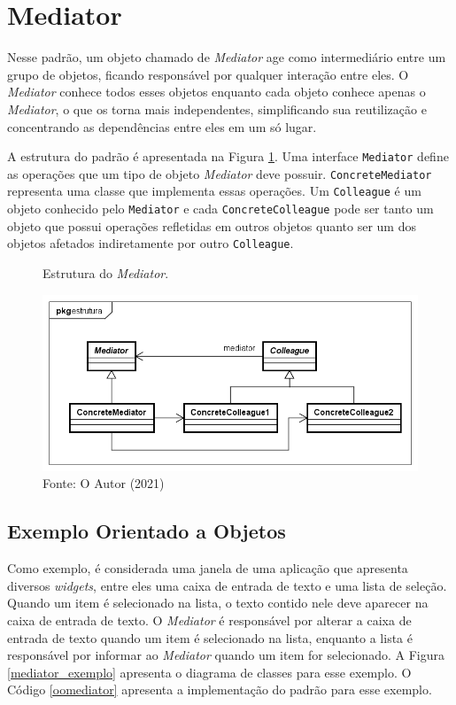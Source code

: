 \section{Mediator}


Nesse padrão, um objeto chamado de \textit{Mediator} age como intermediário 
entre um grupo de objetos, ficando responsável por qualquer 
interação entre eles. O \textit{Mediator} conhece todos 
esses objetos enquanto cada objeto conhece apenas o 
\textit{Mediator}, o que os torna 
mais independentes, simplificando sua reutilização
 e concentrando as dependências entre eles 
em um só lugar. \cite{gamma:1995}

A estrutura do padrão é apresentada na Figura \ref{mediator_struct}. 
Uma interface \texttt{Mediator} define as operações que um tipo de 
objeto \textit{Mediator} deve possuir. \texttt{ConcreteMediator} representa 
uma classe que implementa essas operações. Um \texttt{Colleague} 
é um objeto conhecido pelo \texttt{Mediator} e cada \texttt{ConcreteColleague} 
pode ser tanto um objeto que possui operações refletidas 
em outros objetos quanto ser um dos objetos afetados 
indiretamente por outro \texttt{Colleague}.

\begin{figure}[htb]
	\caption{\label{mediator_struct}Estrutura do \textit{Mediator}.}
	\begin{center}
	    \includegraphics[scale=0.5]{5_padroes-contexto-funcional/5.3_comportamentais/5.3.05_mediator/mediator_estrutura.png}
	\end{center}
  \caption*{Fonte: O Autor (2021)}
\end{figure}

\subsection*{Exemplo Orientado a Objetos}

Como exemplo, é considerada uma janela de uma aplicação 
que apresenta diversos \textit{widgets}, entre eles uma caixa 
de entrada de texto e uma lista de seleção. Quando um item é 
selecionado na lista, o texto contido nele deve aparecer 
na caixa de entrada de texto. O \textit{Mediator} é responsável 
por alterar a caixa de entrada de texto quando um item 
é selecionado na lista, enquanto a lista é responsável 
por informar ao \textit{Mediator} quando um item for selecionado. 
A Figura \ref{mediator_exemplo} apresenta o diagrama 
de classes para esse exemplo. O Código \ref{oomediator} 
apresenta a implementação do padrão para esse exemplo.

